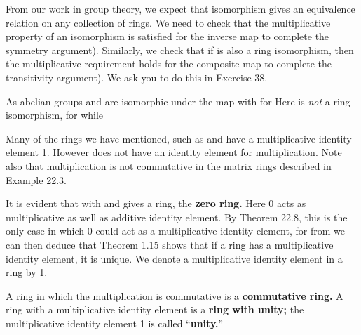 \documentclass[11pt,oneside]{article}
\begin{document}
\begin{BookBody}
From our work in group theory, we expect that isomorphism gives an equivalence relation on any collection of rings. We need to check that the multiplicative property of an isomorphism is satisfied for the inverse map to complete the symmetry argument). Similarly, we check that if  is also a ring isomorphism, then the multiplicative requirement holds for the composite map to complete the transitivity argument). We ask you to do this in Exercise 38.

 As abelian groups and  are isomorphic under the map  with  for  Here \BookInline{\phi } is\textit{ not} a ring isomorphism, for  while \BookEnd{\blacktriangle}


\noindent Many of the rings we have mentioned, such as  and  have a multiplicative identity element 1. However does not have an identity element for multiplication. Note also that multiplication is not commutative in the matrix rings described in Example 22.3.

It is evident that  with  and  gives a ring, the\textbf{ zero ring.} Here 0 acts as multiplicative as well as additive identity element. By Theorem 22.8, this is the only case in which 0 could act as a multiplicative identity element, for from  we can then deduce that  Theorem 1.15 shows that if a ring has a multiplicative identity element, it is unique. We denote a multiplicative identity element in a ring by 1.

 A ring in which the multiplication is commutative is a\textbf{ commutative ring.} A ring with a multiplicative identity element is a\textbf{ ring with unity;} the multiplicative identity element 1 is called “\textbf{unity.}” \BookEnd{\blacksquare}

\end{BookBody}
\end{document}
